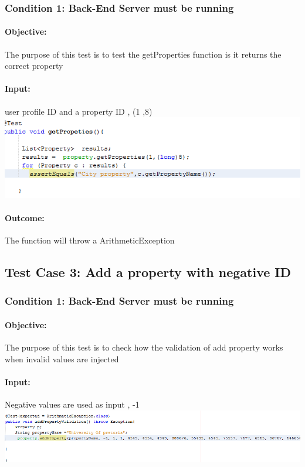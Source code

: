 \documentclass[a4paper,12pt]{article}
\begin{document}
\subsubsection{Condition 1: Back-End Server must be running}
\paragraph{Objective:}The purpose of this test is to test the getProperties function is it returns the correct property
\paragraph{Input:} user profile ID and a property ID , (1 ,8)\\
\includegraphics[width=1\textwidth]{./Images/expectedCase2.png}

\paragraph{Outcome: } The function will throw a ArithmeticException

\subsection{Test Case 3: Add a property with negative ID}
\subsubsection{Condition 1: Back-End Server must be running}
\paragraph{Objective:}The purpose of this test is to check how the validation of add property works when invalid values are injected 
\paragraph{Input:} Negative values are used as input , -1\\
\includegraphics[width=1\textwidth]{./Images/input3.png}
\end{document}
